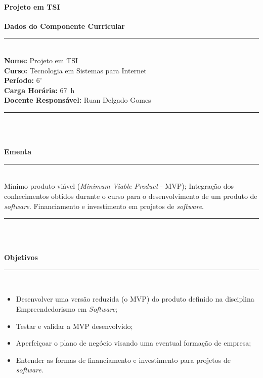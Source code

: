 \paragraph{Projeto em TSI}

\begin{center}\textbf{Dados do Componente Curricular}\end{center}
\vspace{-5mm}
\noindent\rule{16.5cm}{0.4pt}
\\
\textbf{Nome:} Projeto em TSI
\\ 
\textbf{Curso:} Tecnologia em Sistemas para Internet
\\ 
\textbf{Período:} $6^{\circ}$
\\ 
\textbf{Carga Horária:} 67~h
\\ 
\textbf{Docente Responsável:} Ruan Delgado Gomes
\\ 
\noindent\rule{16.5cm}{0.4pt}\\
\\
\vspace{-12mm}
\begin{center}\textbf{Ementa}\end{center}
\vspace{-5mm}
\noindent\rule{16.5cm}{0.4pt}
\\
M\'inimo produto vi\'avel (\textit{Minimum Viable Product} - MVP); Integra\c{c}\~ao dos conhecimentos obtidos durante o curso para o desenvolvimento de um produto de \textit{software}. Financiamento e investimento em projetos de \textit{software}.
\\ 
\noindent\rule{16.5cm}{0.4pt}\\
\\
\vspace{-12mm}
\begin{center}\textbf{Objetivos}\end{center}
\vspace{-5mm}
\noindent\rule{16.5cm}{0.4pt}
\\
\begin{itemize}
\item Desenvolver uma vers\~ao reduzida (o MVP) do produto definido na disciplina Empreendedorismo em \textit{Software};
\item Testar e validar a MVP desenvolvido;
\item Aperfei\c{c}oar o plano de neg\'ocio visando uma eventual forma\c{c}\~ao de empresa;
\item Entender as formas de financiamento e investimento para projetos de \textit{software}.
\end{itemize} 
